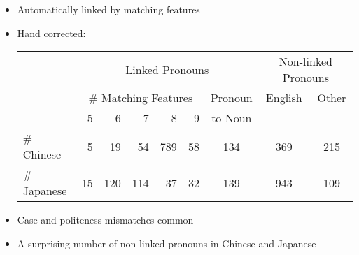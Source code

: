 \documentclass[a4paper,landscape,headrule,footrule,xetex]{foils}
\begin{document}
       \begin{itemize}
       \item Automatically linked by matching features
       \item Hand corrected:\\
\hspace*{-3em}
  \begin{tabular}[t]{lrrrrrccc}
 & \multicolumn{6}{c}{Linked Pronouns} & \multicolumn{2}{c}{Non-linked Pronouns} \\
 &\multicolumn{5}{c}{\# Matching Features} & Pronoun & English & Other \\
 & 5 & 6 & 7 & 8 & 9 & to Noun & & \\
\hline
\# Chinese   & 5 & 19 & 54 & 789 & 58 & 134 & 369 & 215 \\
\# Japanese  & 15 & 120 & 114 & 37 & 32 & 139 & 943 & 109
  \end{tabular}
\item Case and politeness mismatches common
\item A surprising number of non-linked pronouns in Chinese and Japanese
\end{itemize}
\end{document}
